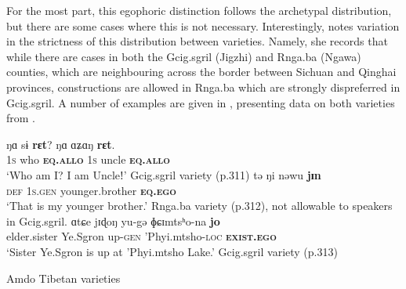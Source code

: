 For the most part, this egophoric distinction follows the archetypal distribution, but there are some cases where this is not necessary. Interestingly,  notes variation in the strictness of this distribution between varieties. Namely, she records that while there are cases in both the Gcig.sgril (Jigzhi) and Rnga.ba (Ngawa) counties, which are neighbouring across the border between Sichuan and Qinghai provinces, constructions are allowed in Rnga.ba which are strongly dispreferred in Gcig.sgril. A number of examples are given in , presenting data on both varieties from .

\begin{exe}
    \ex\label{e:Discussion:Amdo}
    \begin{xlist}
        \ex \label{e:Discussion:Amdo:A}
        \gll ŋɑ sɨ \textbf{rɛt}? ŋɑ ɑʑɑŋ \textbf{rɛt}. \\
        \textsc{1s} who \textsc{\textbf{eq.allo}} \textsc{1s} uncle \textsc{\textbf{eq.allo}} \\
        \glt `Who am I? I am Uncleǃ' Gcig.sgril variety (p.311)
        \ex \label{e:Discussion:Amdo:B}
        \gll tə ŋi nəwu \textbf{jɪn} \\
        \textsc{def} \textsc{1s.gen} younger.brother \textsc{\textbf{eq.ego}} \\
        \glt `That is my younger brother.' Rnga.ba variety (p.312), not allowable to speakers in Gcig.sgril.
        \ex \label{e:Discussion:Amdo:C}
        \gll ɑtɕe jɪɖoŋ yu-gə ɸɕɪmtsʰo-na \textbf{jo} \\
        elder.sister Ye.Sgron up-\textsc{gen} 'Phyi.mtsho-\textsc{loc} \textsc\textbf{{exist.ego}} \\
        `Sister Ye.Sgron is up at 'Phyi.mtsho Lake.' Gcig.sgril variety (p.313)
    \end{xlist}
    Amdo Tibetan varieties \cite[Tibetic: PRC,][311-313, emphasis mine]{Tribur2019}
\end{exe}

